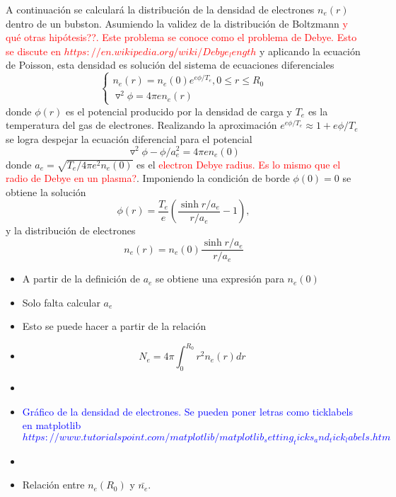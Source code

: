 \documentclass[aps,prb,twocolumn,superscriptaddress,floatfix,longbibliography,10pt]{revtex4-2}
\newif\ifptitle
\newif\ifpnumber
\newcounter{para}
\newcommand\ptitle[1]{\par\refstepcounter{para}
{\ifpnumber{\noindent\textcolor{lightgray}{\textbf{\thepara}}\indent}\fi}
{\ifptitle{\textbf{[{#1}]}}\fi}}
\begin{document}
A continuación se calculará la distribución de la densidad de electrones $n_e(r)$ dentro de un bubston. Asumiendo la validez de la distribución de Boltzmann \textcolor{red}{y qué otras hipótesis??. Este problema se conoce como el problema de Debye. Esto se discute en $https://en.wikipedia.org/wiki/Debye_length$} y aplicando la ecuación de Poisson, esta densidad es solución del sistema de ecuaciones diferenciales
\[
\left\{\begin{matrix}
  n_e(r) = n_e(0)e^{e \phi / T_e}, 0 \leq r \leq R_0 \\
  \triangledown^2 \phi = 4 \pi e n_e(r)
\end{matrix}\right.
\]
donde $\phi(r)$ es el potencial producido por la densidad de carga y $T_e$ es la temperatura del gas de electrones. Realizando la aproximación $e^{e \phi / T_e} \approx 1 + e \phi/T_e$
se logra despejar la ecuación diferencial para el potencial
\[\triangledown^2 \phi - \phi/a_e^2 = 4 \pi e n_e(0) \]
donde $a_e = \sqrt{T_e/4\pi e^2 n_e(0)}$ es el \textcolor{red}{electron Debye radius. Es lo mismo que el radio de Debye en un plasma?}. Imponiendo la condición de borde $\phi(0) = 0$ se obtiene la solución
\begin{equation}
  \phi(r) = \frac{T_e}{e} \left ( \frac{\sinh{r/a_e}}{r/a_e} - 1   \right ),
  \label{eq:cap1_phi}
\end{equation}
y la distribución de electrones
\begin{equation}
  n_e(r) = n_e(0) \frac{\sinh{r/a_e}}{r/a_e}
  \label{eq:cap1_ne}
\end{equation}


\ptitle{Cálculo de las ctes de la expresión de la densidad máxima y de $N_e$ y }

\begin{itemize}
  \item A partir de la definición de $a_e$ se obtiene una expresión para $n_e(0)$
  \item Solo falta calcular $a_e$
  \item Esto se puede hacer a partir de la relación
  \item \[N_e = 4 \pi \int_0^{R_0} r^2 n_e(r) dr \]
  \item 
\end{itemize}


\begin{itemize}
  \item \textcolor{blue}{Gráfico de la densidad de electrones. Se pueden poner letras como ticklabels en matplotlib $https://www.tutorialspoint.com/matplotlib/matplotlib_setting_ticks_and_tick_labels.htm$}
  \item 
  \item Relación entre $n_e(R_0)$ y $\bar{n_e}$.
\end{itemize}
\end{document}
